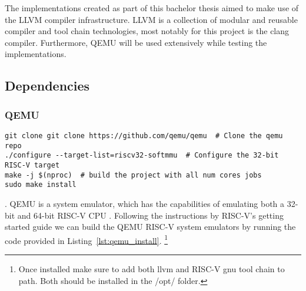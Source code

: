 The implementations created as part of this bachelor thesis aimed
to make use of the LLVM compiler infrastructure.
LLVM is a collection of modular and reusable compiler and tool chain technologies,
most notably for this project is the clang compiler. Furthermore, QEMU will be used extensively while testing the
implementations.

\subsection{Dependencies}
\subsubsection{QEMU}
\begin{lstlisting}[caption=Installing QEMU, float=*, label=lst:qemu_install]
git clone git clone https://github.com/qemu/qemu  # Clone the qemu repo
./configure --target-list=riscv32-softmmu  # Configure the 32-bit RISC-V target
make -j $(nproc)  # build the project with all num cores jobs
sudo make install
\end{lstlisting}.
QEMU is a system emulator, which has the capabilities of emulating both a 32-bit
and 64-bit RISC-V CPU \cite{QEMU}.
Following the instructions by RISC-V's getting started guide
we can build the QEMU RISC-V system emulators by running the code
provided in Listing~\ref{lst:qemu_install}\cite{RISC-V_GS}. \footnote{Once
installed make sure to add both llvm and RISC-V gnu tool chain
to path. Both should be installed in the /opt/ folder.}


